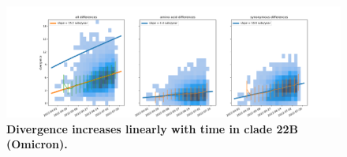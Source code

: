 \begin{figure}
    \includegraphics[width=\textwidth]{figures/rtt/22B_rtt.png}
    \caption{{\bf Divergence increases linearly with time in clade 22B (Omicron).}
    \label{fig:22B_divergence}}
\end{figure}
